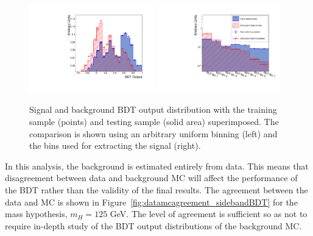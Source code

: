 \begin{figure}
\begin{center}
  \includegraphics[width=0.48\textwidth]{hgg7TeV/sidebandMvaPlots/testvstrain_nolegend}
  \includegraphics[width=0.48\textwidth]{hgg7TeV/sidebandMvaPlots/testvstrain-finalbins-neat}
\end{center}
 \caption{Signal and background BDT output distribution with the training sample (points)
and testing sample (solid area) superimposed. The comparison is shown 
using an arbitrary uniform binning (left) and the bins used for extracting the signal (right).}
 \label{fig:bdttraining}
\end{figure}

In this analysis, the background is estimated entirely from data. This means that disagreement between
data and background MC will affect the performance of the BDT rather than the validity of the final results. 
The agreement between the data and MC is shown in Figure~\ref{fig:datamcagreement_sidebandBDT} for the mass 
hypothesis, $m_{H}=125$ GeV. The level of agreement is sufficient so as not to require in-depth study of the
BDT output distributions of the background MC.

